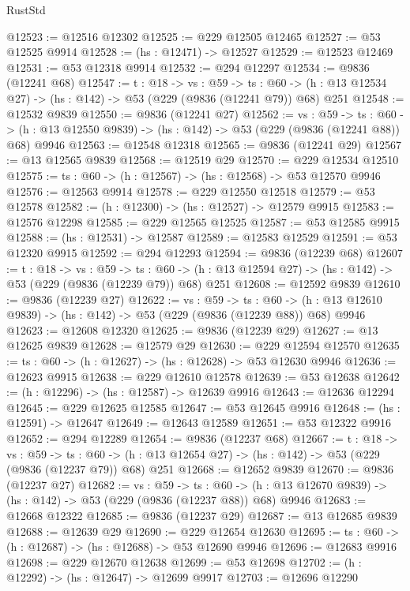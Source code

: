 \begin{lexlean}{RustStd}
\begin{coremodule}
@12523 := @12516 @12302
@12525 := @229 @12505 @12465
@12527 := @53 @12525 @9914
@12528 := (hs : @12471) -> @12527
@12529 := @12523 @12469
@12531 := @53 @12318 @9914
@12532 := @294 @12297
@12534 := @9836 (@12241 @68)
@12547 := {t : @18} ->
  {vs : @59} ->
  {ts : @60} -> (h : @13 @12534 @27) -> (hs : @142) -> @53 (@229 (@9836 (@12241 @79)) @68) @251
@12548 := @12532 @9839
@12550 := @9836 (@12241 @27)
@12562 := {vs : @59} ->
  {ts : @60} -> (h : @13 @12550 @9839) -> (hs : @142) -> @53 (@229 (@9836 (@12241 @88)) @68) @9946
@12563 := @12548 @12318
@12565 := @9836 (@12241 @29)
@12567 := @13 @12565 @9839
@12568 := @12519 @29
@12570 := @229 @12534 @12510
@12575 := {ts : @60} -> (h : @12567) -> (hs : @12568) -> @53 @12570 @9946
@12576 := @12563 @9914
@12578 := @229 @12550 @12518
@12579 := @53 @12578
@12582 := (h : @12300) -> (hs : @12527) -> @12579 @9915
@12583 := @12576 @12298
@12585 := @229 @12565 @12525
@12587 := @53 @12585 @9915
@12588 := (hs : @12531) -> @12587
@12589 := @12583 @12529
@12591 := @53 @12320 @9915
@12592 := @294 @12293
@12594 := @9836 (@12239 @68)
@12607 := {t : @18} ->
  {vs : @59} ->
  {ts : @60} -> (h : @13 @12594 @27) -> (hs : @142) -> @53 (@229 (@9836 (@12239 @79)) @68) @251
@12608 := @12592 @9839
@12610 := @9836 (@12239 @27)
@12622 := {vs : @59} ->
  {ts : @60} -> (h : @13 @12610 @9839) -> (hs : @142) -> @53 (@229 (@9836 (@12239 @88)) @68) @9946
@12623 := @12608 @12320
@12625 := @9836 (@12239 @29)
@12627 := @13 @12625 @9839
@12628 := @12579 @29
@12630 := @229 @12594 @12570
@12635 := {ts : @60} -> (h : @12627) -> (hs : @12628) -> @53 @12630 @9946
@12636 := @12623 @9915
@12638 := @229 @12610 @12578
@12639 := @53 @12638
@12642 := (h : @12296) -> (hs : @12587) -> @12639 @9916
@12643 := @12636 @12294
@12645 := @229 @12625 @12585
@12647 := @53 @12645 @9916
@12648 := (hs : @12591) -> @12647
@12649 := @12643 @12589
@12651 := @53 @12322 @9916
@12652 := @294 @12289
@12654 := @9836 (@12237 @68)
@12667 := {t : @18} ->
  {vs : @59} ->
  {ts : @60} -> (h : @13 @12654 @27) -> (hs : @142) -> @53 (@229 (@9836 (@12237 @79)) @68) @251
@12668 := @12652 @9839
@12670 := @9836 (@12237 @27)
@12682 := {vs : @59} ->
  {ts : @60} -> (h : @13 @12670 @9839) -> (hs : @142) -> @53 (@229 (@9836 (@12237 @88)) @68) @9946
@12683 := @12668 @12322
@12685 := @9836 (@12237 @29)
@12687 := @13 @12685 @9839
@12688 := @12639 @29
@12690 := @229 @12654 @12630
@12695 := {ts : @60} -> (h : @12687) -> (hs : @12688) -> @53 @12690 @9946
@12696 := @12683 @9916
@12698 := @229 @12670 @12638
@12699 := @53 @12698
@12702 := (h : @12292) -> (hs : @12647) -> @12699 @9917
@12703 := @12696 @12290

\end{coremodule}
\end{lexlean}
